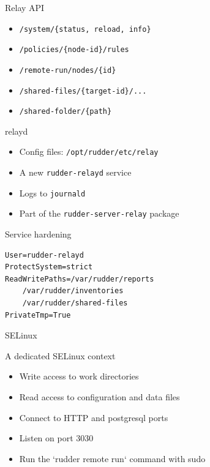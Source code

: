 \documentclass[aspectratio=169, 14pt]{beamer}
\begin{document}
\begin{frame}{Relay API}
	\begin{itemize}
		\item \texttt{/system/\{status, reload, info\}}
		\item \texttt{/policies/\{node-id\}/rules}
		\item \texttt{/remote-run/nodes/\{id\}}
		\item \texttt{/shared-files/\{target-id\}/...}
		\item \texttt{/shared-folder/\{path\}}
	\end{itemize}
\end{frame}

\begin{frame}{relayd}
	\begin{itemize}
		\item Config files: \texttt{/opt/rudder/etc/relay}
		\item A new \texttt{rudder-relayd} service
		\item Logs to \texttt{journald}
		\item Part of the \texttt{rudder-server-relay} package
	\end{itemize}
\end{frame}

\begin{frame}[fragile]{Service hardening}


	\begin{verbatim}
User=rudder-relayd
ProtectSystem=strict
ReadWritePaths=/var/rudder/reports
    /var/rudder/inventories
    /var/rudder/shared-files
PrivateTmp=True
\end{verbatim}
\end{frame}


\begin{frame}[fragile]{SELinux}

	A dedicated SELinux context

	\begin{itemize}
		\item Write access to work directories
		\item Read access to configuration and data files
		\item Connect to HTTP and postgresql ports
		\item Listen on port 3030
		\item Run the `rudder remote run` command with sudo
	\end{itemize}

\end{frame}
\end{document}
